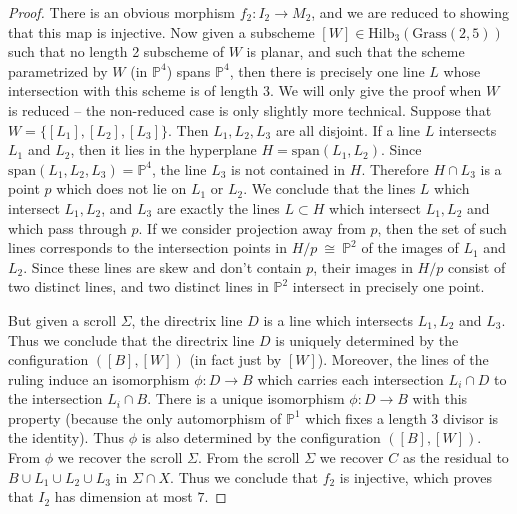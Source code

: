 \documentclass[twoside,12pt,reqno]{amsart}
\theoremstyle{plain}
\theoremstyle{definition}
\newcommand{\PP}{\mathbb{P}}
\newcommand{\HI}[2]{\text{Hilb}_{#1}(#2)}
\def\ps{\vspace{4pt}}
\begin{document}
\begin{proof}
\ps

There is an obvious morphism $f_2:I_2\rightarrow M_2$, and we are
reduced to showing that this map is injective.  Now given a subscheme
$[W]\in \HI{3}{\text{Grass}(2,5)}$ such that no length 2 subscheme of
$W$ is planar, and such that the scheme parametrized by $W$ (in $\PP^4$) spans
$\PP^4$, then there is precisely one line $L$ whose intersection with
this scheme is of length $3$.
We will only give the
proof when $W$ is reduced -- the non-reduced case is only slightly
more technical.  Suppose that $W=\{[L_1],[L_2],[L_3]\}$.  Then $L_1,
L_2, L_3$ are all disjoint.  If a line $L$ intersects $L_1$ and $L_2$, 
then it lies in the hyperplane $H=\text{span}(L_1,L_2)$.  Since
$\text{span}(L_1,L_2,L_3)=\PP^4$, the line $L_3$ is not contained in
$H$.  Therefore $H\cap L_3$ is a point $p$ which does not lie on $L_1$ 
or $L_2$.  We conclude that the lines $L$ which intersect $L_1,L_2$,
and $L_3$ are exactly the lines $L\subset H$ which intersect $L_1,L_2$ 
and which pass through $p$.  If we consider projection away from $p$,
then the set of such lines corresponds to the intersection points in
$H/p~\cong~\PP^2$ of the images of $L_1$ and $L_2$.  Since these lines 
are skew and don't contain $p$, their images in $H/p$ consist of two
distinct lines,  and two distinct lines in $\PP^2$ intersect in
precisely one point.  

\ps

But given a scroll $\Sigma$, the directrix line $D$ is a line which
intersects $L_1, L_2$ and $L_3$.  Thus we conclude that the directrix
line $D$ is uniquely determined by the configuration $([B],[W])$ (in
fact just by $[W]$).  Moreover, the lines of the ruling induce an
isomorphism $\phi:D\rightarrow B$ which carries each intersection
$L_i\cap D$ to the intersection $L_i\cap B$.  There is a unique
isomorphism $\phi:D\rightarrow B$ with this property (because the only
automorphism of $\PP^1$ which fixes a length 3 divisor is the
identity).  Thus $\phi$ is also determined by the configuration
$([B],[W])$.  From $\phi$ we recover the scroll $\Sigma$.
From the scroll $\Sigma$ we recover $C$ as the residual to $B\cup
L_1\cup L_2\cup L_3$ in $\Sigma\cap X$.  Thus we conclude that $f_2$
is injective, which proves that $I_2$ has dimension at most $7$.

\ps


\end{proof}
\end{document}
